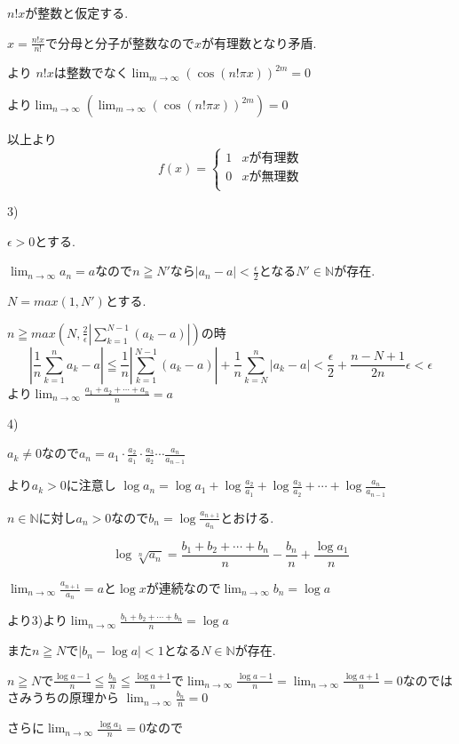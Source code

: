 \documentclass{jsarticle}
\begin{document}
$n!x$が整数と仮定する.

$x=\frac{n!x}{n!}$で分母と分子が整数なので$x$が有理数となり矛盾.

より
$n!x$は整数でなく$\lim_{m\to \infty} (\cos(n!\pi x))^{2m} = 0$

より$\lim_{n\to \infty}(\lim_{m\to \infty} (\cos(n!\pi x))^{2m}) = 0$

以上より
\[f(x) = \begin{cases}
1 & xが有理数 \\
0 & xが無理数 \\
\end{cases}\]

3)

$\epsilon > 0$とする.

$\lim_{n\to \infty}a_n=a$なので$n\geqq N'$なら$|a_n-a|<\frac{\epsilon}{2}$となる$N'\in \mathbb{N}$が存在.

$N=max(1,N')$とする.

$n\geqq max(N,\frac{2}{\epsilon}|\sum_{k=1}^{N-1}(a_k-a)|)$の時
\[
|\frac{1}{n}\sum_{k=1}^n a_k - a| \leqq \frac{1}{n}|\sum_{k=1}^{N-1}(a_k-a)|+\frac{1}{n}\sum_{k=N}^{n}|a_k-a|<\frac{\epsilon}{2} + \frac{n-N+1}{2n}\epsilon<\epsilon
\]
より$\lim_{n\to \infty}\frac{a_1+a_2+\cdots+a_n}{n}=a$

4)

$a_k\neq0$なので$a_n=a_1\cdot \frac{a_2}{a_1}\cdot \frac{a_3}{a_2}\cdots \frac{a_n}{a_{n-1}}$

より$a_k>0$に注意し
$\log a_n = \log a_1 + \log \frac{a_2}{a_1}+\log \frac{a_3}{a_2}+\cdots +\log \frac{a_n}{a_{n-1}}$

$n\in\mathbb{N}$に対し$a_n > 0$なので$b_n=\log \frac{a_{n+1}}{a_n}$とおける.

\[\log \sqrt[n]{a_n}=\frac{b_1+b_2+\cdots +b_n}{n} - \frac{b_n}{n}+\frac{\log a_1}{n}\]

$\lim_{n\to \infty}\frac{a_{n+1}}{a_n}=a$と$\log x$が連続なので$\lim_{n\to \infty}b_n=\log a$

より3)より$\lim _{n\to \infty}\frac{b_1+b_2+\cdots +b_n}{n} = \log a$

また$n\geqq N$で$|b_n - \log a|<1$となる$N\in\mathbb{N}$が存在.

$n\geqq N$で$\frac{\log a -1}{n}\leqq \frac{b_n}{n} \leqq \frac{\log a+1}{n}$で$\lim_{n\to\infty}\frac{\log a -1}{n} = \lim_{n\to\infty}\frac{\log a +1}{n}=0$なのではさみうちの原理から
$\lim_{n\to\infty} \frac{b_n}{n} = 0$

さらに$\lim_{n\to\infty} \frac{\log a_1}{n} = 0$なので
\end{document}
